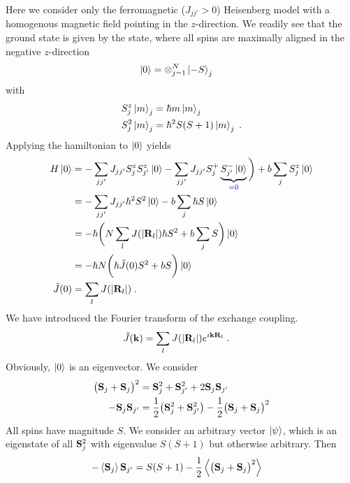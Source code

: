 Here we consider only the   ferromagnetic ($J_{jj'}>0$) Heisenberg model
with a homogenous magnetic field pointing in the $z$-direction.
We readily see that the ground state is given by the 
state, where all spins are maximally aligned in the negative $z$-direction
%
\begin{align}\label{eq:}
\ket{0} &= \otimes_{j=1}^{N} \ket{-S}_{j}
\end{align}
%
with
\begin{subequations}\label{eq:}
\begin{align}
S_{j}^{z} \ket{m}_{j} &=\hbar m \ket{m}_{j}\\
S_{j}^{2} \ket{m}_{j} &=\hbar^{2} S(S+1) \ket{m}_{j}\;.
\end{align}
\end{subequations}
Applying the hamiltonian to $\ket{0}$ yields
%
\begin{align*}
H\ket{0} &= - \sum_{jj'} J_{jj'} S_{j}^{z}  S_{j'}^{z}\ket{0}
- \sum_{jj'} J_{jj'} S_{j}^{+} \underbrace{
S_{j'}^{-}\ket{0}
}_{\color{blue} = 0}
\bigg) + b \sum_{j} S^{z}_{j}\ket{0}\\
&= - \sum_{jj'} J_{jj'} \hbar^{2} S^{2}  \ket{0} - b \sum_{j} \hbar S \ket{0}\\
&=-\hbar  \bigg(N \sum_{l} J(|\mathbf R_{l}|) \hbar  S^{2}  + b \sum_{j}  S \bigg)\ket{0}\\
&=-\hbar  N \bigg(\hbar \tilde J(0)  S^{2}  + b   S \bigg)\ket{0}\\
\tilde J(0) &=  \sum_{l} J(|\mathbf R_{l}|) \;.
\end{align*}
%
We have introduced the Fourier transform of the exchange coupling.
%
\begin{align}\label{eq:heisenberg:J:q}
\tilde J(\mathbf k) &= \sum_{l} J(|\mathbf R_{l}|) e^{i \mathbf k \mathbf R_{l}}\;.
\end{align}
%
Obviously, $\ket{0}$ is an eigenvector.
We consider
%
\begin{align*}
\big( \mathbf S_{j} + \mathbf S_{j} \big)^{2} &= \mathbf S_{j}^{2}+\mathbf S_{j'}^{2} + 2 \mathbf S_{j} \mathbf S_{j'}\\
- \mathbf S_{j} \mathbf S_{j'} &= \frac{1}{2}\big(\mathbf S_{j}^{2}+\mathbf S_{j'}^{2} \big)- 
\frac{1}{2}\big( \mathbf S_{j} + \mathbf S_{j} \big)^{2}
\end{align*}
%
All spins have magnitude $S$. We consider an arbitrary vector $\ket{\psi}$, which is an eigenstate 
of all $\mathbf S_{j}^{2}$  with eigenvalue $S(S+1)$ but otherwise arbitrary. Then
\begin{align*}
- \left\langle\mathbf S_{j}\right\rangle \mathbf S_{j'} &= S(S+1) 
- \frac{1}{2}\left\langle\big( \mathbf S_{j} + \mathbf S_{j} \big)^{2}\right\rangle
\end{align*}
